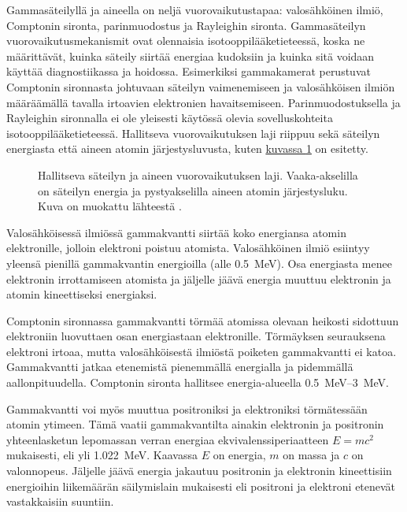 Gammasäteilyllä ja aineella on neljä vuorovaikutustapaa: valosähköinen ilmiö, Comptonin sironta, parinmuodostus ja Rayleighin sironta. Gammasäteilyn vuorovaikutusmekanismit ovat olennaisia isotooppilääketieteessä, koska ne määrittävät, kuinka säteily siirtää energiaa kudoksiin ja kuinka sitä voidaan käyttää diagnostiikassa ja hoidossa\cite{cherry_interaction_2012}. Esimerkiksi gammakamerat perustuvat Comptonin sironnasta johtuvaan säteilyn vaimenemiseen ja valosähköisen ilmiön määräämällä tavalla irtoavien elektronien havaitsemiseen. Parinmuodostuksella ja Rayleighin sironnalla ei ole yleisesti käytössä olevia sovelluskohteita isotooppilääketieteessä.\cite{cherry_interaction_2012} Hallitseva vuorovaikutuksen laji riippuu sekä säteilyn energiasta että aineen atomin järjestysluvusta, kuten \hyperref[fig:vuorovaikutus]{kuvassa \ref*{fig:vuorovaikutus}} on esitetty.

\begin{figure}[H]
    \centering
    \captionsetup{width=.9\textwidth}
    
    \caption{Hallitseva säteilyn ja aineen vuorovaikutuksen laji. Vaaka-akselilla on säteilyn energia ja pystyakselilla aineen atomin järjestysluku. Kuva on muokattu lähteestä \cite{evans_atomic_1955}.}
    \label{fig:vuorovaikutus}
\end{figure}

Valosähköisessä ilmiössä gammakvantti siirtää koko energiansa atomin elektronille, jolloin elektroni poistuu atomista. Valosähköinen ilmiö esiintyy yleensä pienillä gammakvantin energioilla (alle \qty{0.5}{\mega\electronvolt}). Osa energiasta menee elektronin irrottamiseen atomista ja jäljelle jäävä energia muuttuu elektronin ja atomin kineettiseksi energiaksi.\cite{cherry_interaction_2012}

Comptonin sironnassa gammakvantti törmää atomissa olevaan heikosti sidottuun elektroniin luovuttaen osan energiastaan elektronille. Törmäyksen seurauksena elektroni irtoaa, mutta valosähköisestä ilmiöstä poiketen gammakvantti ei katoa. Gammakvantti jatkaa etenemistä pienemmällä energialla ja pidemmällä aallonpituudella. Comptonin sironta hallitsee energia-alueella \qtyrange{0.5}{3}{\mega\electronvolt}.\cite{cherry_interaction_2012}

Gammakvantti voi myös muuttua positroniksi ja elektroniksi törmätessään atomin ytimeen. Tämä vaatii gammakvantilta ainakin elektronin ja positronin yhteenlasketun lepomassan verran energiaa ekvivalenssiperiaatteen $E=mc^2$ mukaisesti, eli yli \qty{1.022}{\mega\electronvolt}. Kaavassa $E$ on energia, $m$ on massa ja $c$ on valonnopeus. Jäljelle jäävä energia jakautuu positronin ja elektronin kineettisiin energioihin liikemäärän säilymislain mukaisesti eli positroni ja elektroni etenevät vastakkaisiin suuntiin.\cite{cherry_interaction_2012}

